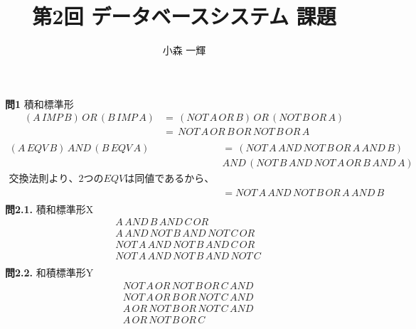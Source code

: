 \documentclass[dvipdfmx,10pt, a4j]{jarticle}
\title{第2回 データベースシステム 課題}
\author{小森 一輝}
\theoremstyle{definition}
\begin{document}
    \maketitle

    \setcounter{section}{2}
    \noindent
    \textbf{問1} 積和標準形\\
    \begin{align*}
        (A\, IMP\, B)\, OR\, (B\, IMP\, A)
        &=\, (NOT\, A\, OR\, B)\, OR\, (NOT\, B\, OR\, A)\\
        &=\, NOT\, A\, OR\, B\, OR\, NOT\, B\, OR\, A\\
    \end{align*}
    \begin{align*}
        (A\, EQV\, B)\, AND\, (B\, EQV\, A)
        &=\, (NOT\, A\, AND\, NOT\, B\, OR\, A\, AND\, B)\\
        &AND\, (NOT\, B\, AND\, NOT\, A\, OR\, B\, AND\, A)\\
        交換法則より、2つの EQV は同値であるから、\\
        &= NOT\, A\, AND\, NOT\, B\, OR\, A\, AND\, B\\
    \end{align*}
    \noindent
    \textbf{問2.1.} 積和標準形X\\
    \begin{align*}
        &A\, AND\, B\, AND\, C\, OR\\
        &A\, AND\, NOT\, B\, AND\, NOT\, C\, OR\\
        &NOT\, A\, AND\, NOT\, B\, AND\, C\, OR\\
        &NOT\, A\, AND\, NOT\, B\, AND\, NOT\, C\\
    \end{align*}
    \noindent
    \textbf{問2.2.} 和積標準形Y\\
    \begin{align*}
        &NOT\, A\, OR\, NOT\, B\, OR\, C\, AND\\
        &NOT\, A\, OR\, B\, OR\, NOT\, C\, AND\\
        &A\, OR\, NOT\, B\, OR\, NOT\, C\, AND\\
        &A\, OR\, NOT\, B\, OR\, C\\
    \end{align*}
\end{document}
